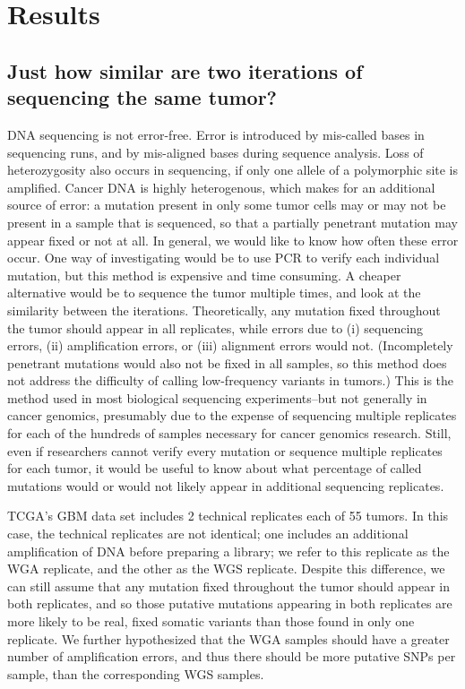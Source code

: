 \documentclass[11pt]{article} %
\begin{document}
\section*{Results}

\subsection{Just how similar are two iterations of sequencing the same tumor?}


DNA sequencing is not error-free. Error is introduced by mis-called bases in sequencing runs, and by mis-aligned bases during sequence analysis. Loss of heterozygosity also occurs in sequencing, if only one allele of a polymorphic site is amplified. Cancer DNA is highly heterogenous, which makes for an additional source of error: a mutation present in only some tumor cells may or may not be present in a sample that is sequenced, so that a partially penetrant mutation may appear fixed or not at all. In general, we would like to know how often these error occur. One way of investigating would be to use PCR to verify each individual mutation, but this method is expensive and time consuming. A cheaper alternative would be to sequence the tumor multiple times, and look at the similarity between the iterations. Theoretically, any mutation fixed throughout the tumor should appear in all replicates, while errors due to (i) sequencing errors, (ii) amplification errors, or (iii) alignment errors would not. (Incompletely penetrant mutations would also not be fixed in all samples, so this method does not address the difficulty of calling low-frequency variants in tumors.) This is the method used in most biological sequencing experiments--but not generally in cancer genomics, presumably due to the expense of sequencing multiple replicates for each of the hundreds of samples necessary for cancer genomics research. Still, even if researchers cannot verify every mutation or sequence multiple replicates for each tumor, it would be useful to know about what percentage of called mutations would or would not likely appear in additional sequencing replicates.

TCGA's GBM data set includes 2 technical replicates each of 55 tumors. In this case, the technical replicates are not identical; one includes an additional amplification of DNA before preparing a library; we refer to this replicate as the WGA replicate, and the other as the WGS replicate. Despite this difference, we can still assume that any mutation fixed throughout the tumor should appear in both replicates, and so those putative mutations appearing in both replicates are more likely to be real, fixed somatic variants than those found in only one replicate. We further hypothesized that the WGA samples should have a greater number of amplification errors, and thus there should be more putative SNPs per sample, than the corresponding WGS samples. 
\end{document}
